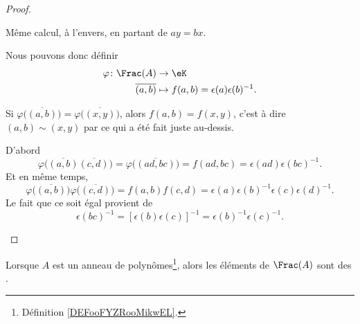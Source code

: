 \begin{proof}
\begin{subproof}
\begin{subproof}
			\spitem[\( \Leftarrow\)]
			Même calcul, à l'envers, en partant de \( ay=bx\).
		\end{subproof}
		Nous pouvons donc définir
		\begin{equation}
			\begin{aligned}
				\varphi\colon \Frac(A) & \to \eK                                     \\
				\overline{(a,b)}       & \mapsto f(a,b)=\epsilon(a)\epsilon(b)^{-1}.
			\end{aligned}
		\end{equation}

		\begin{subproof}
			Si \( \varphi\big( \overline{(a,b)} \big)=\varphi\big( \overline{(x,y)} \big)\), alors \( f(a,b)=f(x,y)\), c'est à dire \( (a,b)\sim(x,y)\) par ce qui a été fait juste au-dessis.

			D'abord
			\begin{equation}
				\varphi\big( \overline{(a,b)}\overline{(c,d)} \big)=\varphi\big( \overline{(ad,bc)} \big)=f(ad,bc)=\epsilon(ad)\epsilon(bc)^{-1}.
			\end{equation}
			Et en même temps,
			\begin{equation}
				\varphi\big( \overline{(a,b)} \big)\varphi\big( \overline{(c,d)} \big)=f(a,b)f(c,d)=\epsilon(a)\epsilon(b)^{-1}\epsilon(c)\epsilon(d)^{-1}.
			\end{equation}
			Le fait que ce soit égal provient de
			\begin{equation}
				\epsilon(bc)^{-1}=[\epsilon(b)\epsilon(c)]^{-1}=\epsilon(b)^{-1}\epsilon(c)^{-1}.
			\end{equation}
		\end{subproof}
	\end{subproof}
\end{proof}


\begin{definition}	\label{DEFooXHKGooCcJbTR}
	Lorsque \( A\) est un anneau de polynômes\footnote{Définition \ref{DEFooFYZRooMikwEL}.}, alors les éléments de \( \Frac(A)\) sont des .
\end{definition}



